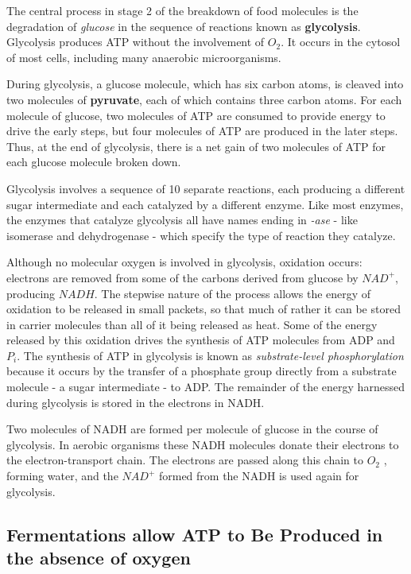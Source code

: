 The central process in stage 2 of the breakdown of food molecules is
the degradation of \textit{glucose} in the sequence of reactions known as \textbf{glycolysis}.
Glycolysis produces ATP without the involvement of $O_2$. It occurs in the cytosol of
most cells, including many anaerobic microorganisms.

During glycolysis, a glucose molecule, which has six carbon atoms, is
cleaved into two molecules of \textbf{pyruvate}, each of which contains three
carbon atoms. For each molecule of glucose, two molecules of ATP are
consumed to provide energy to drive the early steps, but four molecules
of ATP are produced in the later steps. Thus, at the end of glycolysis, there
is a net gain of two molecules of ATP for each glucose molecule broken
down.

Glycolysis involves a sequence of 10 separate reactions, each producing
a different sugar intermediate and each catalyzed by a different enzyme.
Like most enzymes, the enzymes that catalyze glycolysis all have names ending in \textit{-ase} - like
isomerase and dehydrogenase - which specify the type of reaction they
catalyze.

Although no molecular oxygen is involved in glycolysis, oxidation occurs:
electrons are removed from some of the carbons derived from glucose
by $NAD^{+}$, producing $NADH$. The stepwise nature of the process allows
the energy of oxidation to be released in small packets, so that much of
rather it can be stored in carrier molecules than all of it being released
as heat. Some of the energy released by this oxidation
drives the synthesis of ATP molecules from ADP and $P_{i}$. The synthesis
of ATP in glycolysis is known as \textit{substrate-level phosphorylation} because
it occurs by the transfer of a phosphate group directly from a substrate
molecule - a sugar intermediate - to ADP. The remainder of the energy
harnessed during glycolysis is stored in the electrons in NADH.

Two molecules of NADH are formed per molecule of glucose in the
course of glycolysis. In aerobic organisms these NADH molecules donate
their electrons to the electron-transport chain.
The electrons are passed along this chain to $O_2$ , forming
water, and the $NAD^{+}$ formed from the NADH is used again for glycolysis.

\subsection{Fermentations allow ATP to Be Produced in the absence of oxygen}

